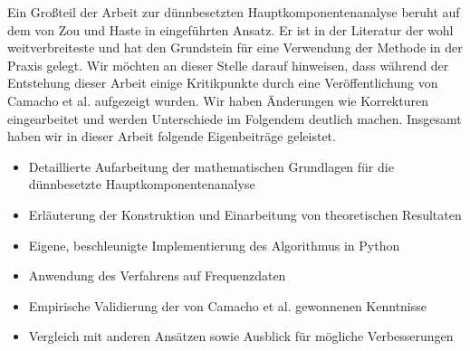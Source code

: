 Ein Großteil der Arbeit zur dünnbesetzten Hauptkomponentenanalyse beruht auf dem von Zou und Haste in \cite{zou_sparsepca} eingeführten Ansatz. Er ist in der Literatur der wohl weitverbreiteste und hat den Grundstein für eine Verwendung der Methode in der Praxis gelegt. Wir möchten an dieser Stelle darauf hinweisen, dass während der Entstehung dieser Arbeit einige Kritikpunkte durch eine Veröffentlichung von Camacho et al. aufgezeigt wurden. Wir haben Änderungen wie Korrekturen eingearbeitet und werden Unterschiede im Folgendem deutlich machen. Insgesamt haben wir in dieser Arbeit folgende Eigenbeiträge geleistet.
\begin{itemize}
\item Detaillierte Aufarbeitung der mathematischen Grundlagen für die dünnbesetzte Hauptkomponentenanalyse
\item Erläuterung der Konstruktion und Einarbeitung von theoretischen Resultaten
\item Eigene, beschleunigte Implementierung des Algorithmus in Python
\item Anwendung des Verfahrens auf Frequenzdaten
\item Empirische Validierung der von Camacho et al. gewonnenen Kenntnisse
\item Vergleich mit anderen Ansätzen sowie Ausblick für mögliche Verbesserungen
\end{itemize}